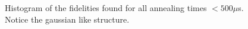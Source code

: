 \begin{figure}
	\caption[Short Time Fidelity Histogram]{Histogram of the fidelities found for all annealing times  $< 500 \mu$s.  Notice the gaussian like structure.}
	\label{fig:fid_hist}
\end{figure}

